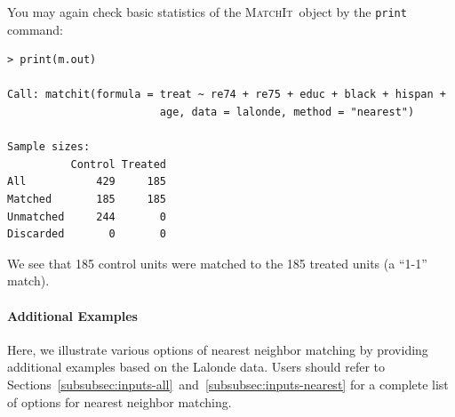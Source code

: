 \documentclass[oneside,letterpaper,titlepage]{article}
\newcommand{\MatchIt}{\textsc{MatchIt}}
\begin{document}
\noindent You may again check basic statistics of the \MatchIt\ object by the
\texttt{print} command:
\begin{verbatim}
> print(m.out)

Call: matchit(formula = treat ~ re74 + re75 + educ + black + hispan +
                        age, data = lalonde, method = "nearest")

Sample sizes:
          Control Treated
All           429     185
Matched       185     185
Unmatched     244       0
Discarded       0       0
\end{verbatim}

We see that 185 control units were matched to the 185 treated units (a
``1-1'' match).  

\paragraph{Additional Examples}
Here, we illustrate various options of nearest neighbor matching by
providing additional examples based on the Lalonde data. Users should
refer to
Sections~\ref{subsubsec:inputs-all}~and~\ref{subsubsec:inputs-nearest}
for a complete list of options for nearest neighbor matching.
\end{document}
